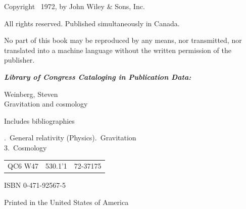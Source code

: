 
\clearpage
\thispagestyle{empty}
\begingroup
\small
\vspace*{\fill}

\noindent Copyright \textcopyright\ 1972, by John Wiley \& Sons, Inc.

\medskip
\noindent All rights reserved. Published simultaneously in Canada.

\medskip
\noindent No part of this book may be reproduced by any means, nor transmitted,
nor translated into a machine language without the written permission of the
publisher.

\bigskip
\noindent\textbf{\textit{Library of Congress Cataloging in Publication Data:}}

\smallskip
\noindent Weinberg, Steven\\
Gravitation and cosmology

\medskip
\noindent Includes bibliographies

\smallskip
{}.\ General relativity (Physics).\ Gravitation\\
3.\ Cosmology

\smallskip
\noindent
\begin{tabular}{@{}lll@{}}
QC6 W47 & 530.1'1 & 72-37175
\end{tabular}

\smallskip
\noindent ISBN 0-471-92567-5

\medskip
\noindent Printed in the United States of America

\smallskip
{}

\vspace*{\fill}
\endgroup
